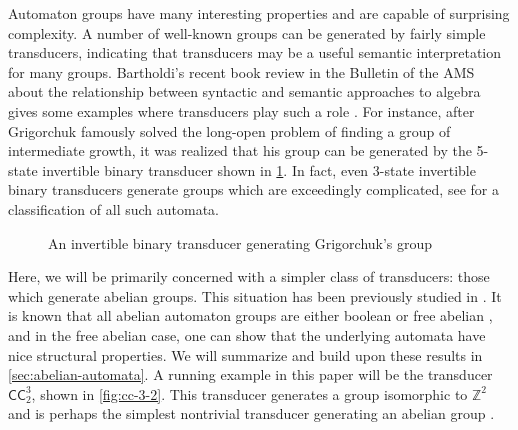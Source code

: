 \documentclass[12pt, letterpaper]{article}
\newcommand{\Z}{\mathbb Z}
\newcommand{\CC}{\mathsf{CC}}
\begin{document}
Automaton groups have many interesting properties and are capable of surprising
complexity. A number of well-known groups can be generated by fairly simple
transducers, indicating that transducers may be a useful semantic
interpretation for many groups. Bartholdi's recent book review in the Bulletin
of the AMS about the relationship between syntactic and semantic approaches to
algebra gives some examples where transducers play such a role
\cite{Bartholdi17:syntax_semantic_review}.  For instance, after Grigorchuk
famously solved the long-open problem of finding a group of intermediate
growth, it was realized that his group can be generated by the 5-state
invertible binary transducer shown in \cref{fig:grigorchuk}.  In fact, even
3-state invertible binary transducers generate groups which are exceedingly
complicated, see \cite{Bondarenko3state} for a classification of all such
automata.
\begin{figure}[ht]
    \centering
    \caption{An invertible binary transducer generating Grigorchuk's group}
    \label{fig:grigorchuk}
\end{figure}

Here, we will be primarily concerned with a simpler class of transducers: those
which generate abelian groups. This situation has been previously studied in
\cite{Okano-Thesis, Sutner18:abelian_automata}. It is known that all abelian
automaton groups are either boolean or free abelian
\cite{nekrashevych2004automorphisms}, and in the free abelian case, one can
show that the underlying automata have nice structural properties. We will
summarize and build upon these results in \cref{sec:abelian-automata}.  A
running example in this paper will be the transducer $\CC^3_2$, shown in
\cref{fig:cc-3-2}. This transducer generates a group isomorphic to $\Z^2$ and
is perhaps the simplest nontrivial transducer generating an abelian group
\cite{jalc170214}.
\end{document}
